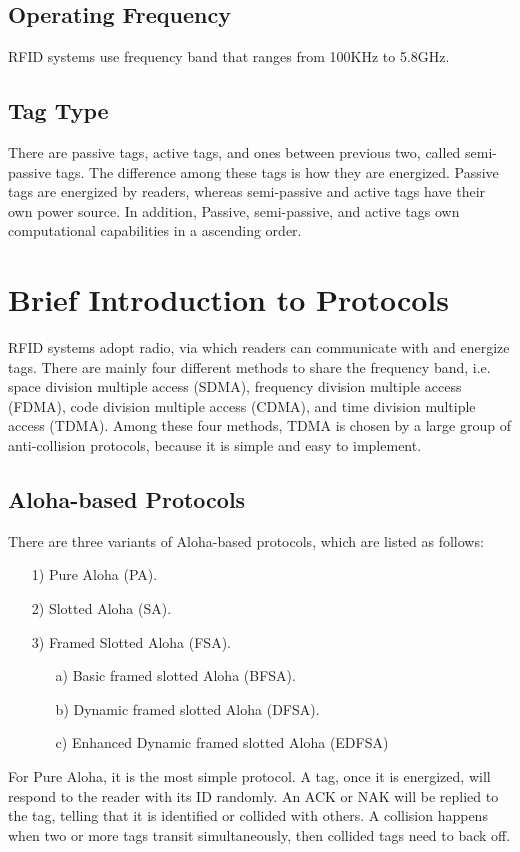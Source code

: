 \documentclass[12pt,letterpaper]{article}
\begin{document}
\subsection{Operating Frequency}
RFID systems use frequency band that ranges from 100KHz
to 5.8GHz\cite{survey}. 

\subsection{Tag Type}
There are passive tags, active tags, and ones between previous
two, called semi-passive tags. The difference among these tags
is how they are energized. Passive tags are energized by readers, 
whereas semi-passive and active tags have their own power source.
In addition, Passive, semi-passive, and active tags own computational
capabilities in a ascending order.

\section{Brief Introduction to Protocols}
RFID systems adopt radio, via which readers can communicate with
and energize tags. There are mainly four different methods to share
the frequency band, i.e. space division multiple access (SDMA), 
frequency division multiple access (FDMA), code division multiple
access (CDMA), and time division multiple access (TDMA). Among
these four methods, TDMA is chosen by a large group of anti-collision
protocols, because it is simple and easy to implement.
\subsection{Aloha-based Protocols}
There are three variants of Aloha-based protocols, which are listed
as follows:
\begin{itemize}
 \item[1)] Pure Aloha (PA).
 \item[2)] Slotted Aloha (SA).
 \item[3)] Framed Slotted Aloha (FSA).
 	\begin{itemize}
 		\item[a)] Basic framed slotted Aloha (BFSA).
 		\item[b)] Dynamic framed slotted Aloha (DFSA).
 		\item[c)] Enhanced Dynamic framed slotted Aloha (EDFSA)
 	\end{itemize} 
\end{itemize}

For Pure Aloha, it is the most simple protocol. A tag, once it is
energized, will respond to the reader with its ID randomly. An
ACK or NAK will be replied to the tag, telling that it is identified 
or collided with others. A collision happens when two or more 
tags transit simultaneously, then collided tags need to back off.
\end{document}

